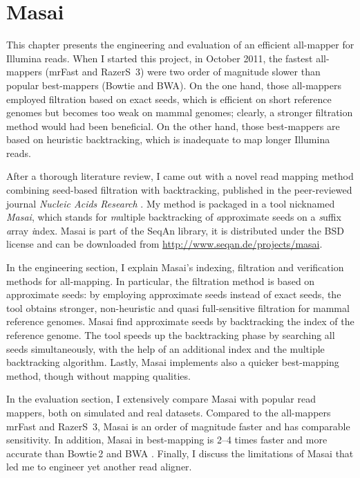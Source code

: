 \chapter{Masai}
\label{sec:masai}

This chapter presents the engineering and evaluation of an efficient all-mapper for Illumina reads.
When I started this project, in October 2011, the fastest all-mappers (mrFast and RazerS~3) were two order of magnitude slower than popular best-mappers (Bowtie and BWA).
On the one hand, those all-mappers employed filtration based on exact seeds, which is efficient on short reference genomes but becomes too weak on mammal genomes; clearly, a stronger filtration method would had been beneficial.
On the other hand, those best-mappers are based on heuristic backtracking, which is inadequate to map longer Illumina reads.

After a thorough literature review, I came out with a novel read mapping method combining seed-based filtration with backtracking, published in the peer-reviewed journal \emph{Nucleic Acids Research} \citep{Siragusa2013}.
My method is packaged in a \CC tool nicknamed \emph{Masai}, which stands for \emph{m}ultiple backtracking of \emph{a}pproximate seeds on a \emph{s}uffix \emph{a}rray \emph{i}ndex.
Masai is part of the SeqAn library, it is distributed under the BSD license and can be downloaded from \url{http://www.seqan.de/projects/masai}.

In the engineering section, I explain Masai's indexing, filtration and verification methods for all-mapping.
In particular, the filtration method is based on approximate seeds: by employing approximate seeds instead of exact seeds, the tool obtains stronger, non-heuristic and quasi full-sensitive filtration for mammal reference genomes.
Masai find approximate seeds by backtracking the index of the reference genome.
The tool speeds up the backtracking phase by searching all seeds simultaneously, with the help of an additional index and the multiple backtracking algorithm.
Lastly, Masai implements also a quicker best-mapping method, though without mapping qualities.

In the evaluation section, I extensively compare Masai with popular read mappers, both on simulated and real datasets.
Compared to the all-mappers mrFast and RazerS~3, Masai is an order of magnitude faster and has comparable sensitivity.
In addition, Masai in best-mapping is 2--4 times faster and more accurate than Bowtie\,2 \citep{Langmead2012} and BWA \citep{Li2009}.
Finally, I discuss the limitations of Masai that led me to engineer yet another read aligner.

